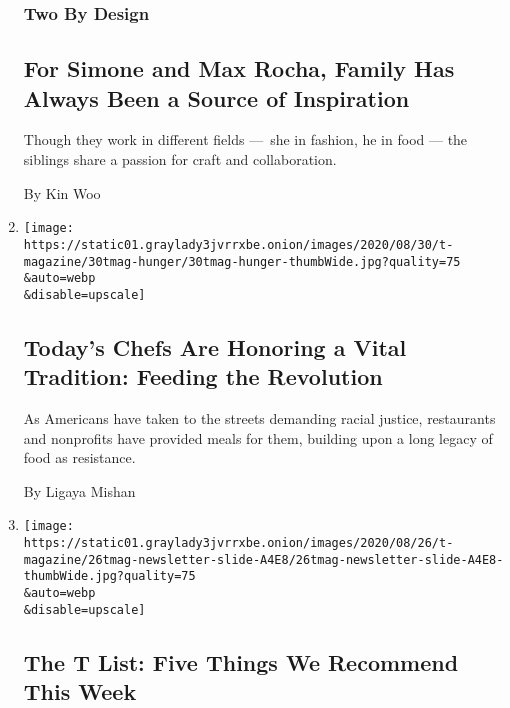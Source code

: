 \begin{enumerate}
  \hypertarget{two-by-design}{%
  \subsubsection{Two By Design}\label{two-by-design}}

  \hypertarget{for-simone-and-max-rocha-family-has-always-been-a-source-of-inspiration}{%
  \subsection{For Simone and Max Rocha, Family Has Always Been a Source
  of
  Inspiration}\label{for-simone-and-max-rocha-family-has-always-been-a-source-of-inspiration}}

  Though they work in different fields ---~she in fashion, he in food
  --- the siblings share a passion for craft and collaboration.

  By Kin Woo
\item
  \href{/2020/08/28/t-magazine/food-protest-revolution.html}{}

  \texttt{[image: https://static01.graylady3jvrrxbe.onion/images/2020/08/30/t-magazine/30tmag-hunger/30tmag-hunger-thumbWide.jpg?quality=75\\\&auto=webp\\\&disable=upscale]}

  \hypertarget{todays-chefs-are-honoring-a-vital-tradition-feeding-the-revolution}{%
  \subsection{Today's Chefs Are Honoring a Vital Tradition: Feeding the
  Revolution}\label{todays-chefs-are-honoring-a-vital-tradition-feeding-the-revolution}}

  As Americans have taken to the streets demanding racial justice,
  restaurants and nonprofits have provided meals for them, building upon
  a long legacy of food as resistance.

  By Ligaya Mishan
\item
  \href{/2020/08/27/t-magazine/misi-pasta-gregory-halpern.html}{}

  \texttt{[image: https://static01.graylady3jvrrxbe.onion/images/2020/08/26/t-magazine/26tmag-newsletter-slide-A4E8/26tmag-newsletter-slide-A4E8-thumbWide.jpg?quality=75\\\&auto=webp\\\&disable=upscale]}

  \hypertarget{the-t-list-five-things-we-recommend-this-week-1}{%
  \subsection{The T List: Five Things We Recommend This
  Week}\label{the-t-list-five-things-we-recommend-this-week-1}}


\end{enumerate}
